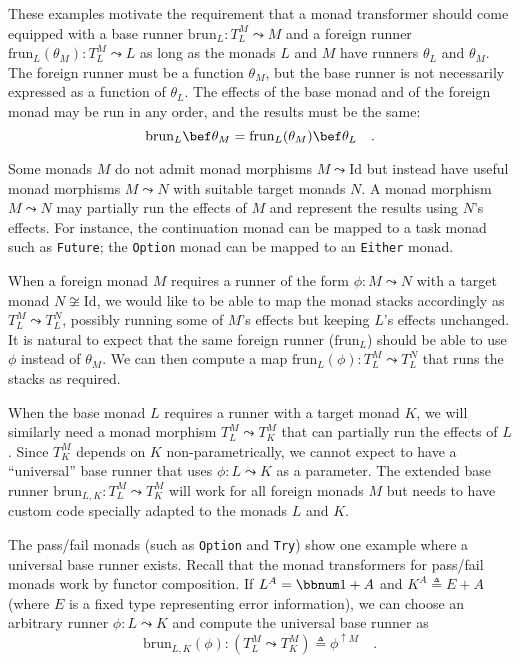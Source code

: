 These examples motivate the requirement that a monad transformer should
come equipped with a base runner $\text{brun}_{L}:T_{L}^{M}\leadsto M$
and a foreign runner $\text{frun}_{L}(\theta_{M}):T_{L}^{M}\leadsto L$
as long as the monads $L$ and $M$ have runners $\theta_{L}$ and
$\theta_{M}$. The foreign runner must be a function $\theta_{M}$,
but the base runner is not necessarily expressed as a function of
$\theta_{L}$. The effects of the base monad and of the foreign monad
may be run in any order, and the results must be the same:
\[
\text{brun}_{L}\bef\theta_{M}=\text{frun}_{L}(\theta_{M})\bef\theta_{L}\quad.
\]

Some monads $M$ do not admit monad morphisms $M\leadsto\text{Id}$
but instead have useful monad morphisms $M\leadsto N$ with suitable
target monads $N$. A monad morphism $M\leadsto N$ may partially
run the effects of $M$ and represent the results using $N$\textsf{'}s effects.
For instance, the continuation monad can be mapped to a task monad
such as \lstinline!Future!; the \lstinline!Option! monad can be
mapped to an \lstinline!Either! monad. 

When a foreign monad $M$ requires a runner of the form $\phi:M\leadsto N$
with a target monad $N\not\cong\text{Id}$, we would like to be able
to map the monad stacks accordingly as $T_{L}^{M}\leadsto T_{L}^{N}$,
possibly running some of $M$\textsf{'}s effects but keeping $L$\textsf{'}s effects
unchanged. It is natural to expect that the same foreign runner ($\text{frun}_{L}$)
should be able to use $\phi$ instead of $\theta_{M}$. We can then
compute a map $\text{frun}_{L}\left(\phi\right):T_{L}^{M}\leadsto T_{L}^{N}$
that runs the stacks as required.

When the base monad $L$ requires a runner with a target monad $K$,
we will similarly need a monad morphism $T_{L}^{M}\leadsto T_{K}^{M}$
that can partially run the effects of $L$. Since $T_{K}^{M}$ depends
on $K$ non-parametrically, we cannot expect to have a \textsf{``}universal\textsf{''}
base runner that uses $\phi:L\leadsto K$ as a parameter. The extended
base runner $\text{brun}_{L,K}:T_{L}^{M}\leadsto T_{K}^{M}$ will
work for all foreign monads $M$ but needs to have custom code specially
adapted to the monads $L$ and $K$.

The pass/fail monads (such as \lstinline!Option! and \lstinline!Try!)
show one example where a universal base runner
exists. Recall that the monad transformers for pass/fail monads work
by functor composition. If $L^{A}=\bbnum 1+A$ and $K^{A}\triangleq E+A$
(where $E$ is a fixed type representing error information), we can
choose an arbitrary runner $\phi:L\leadsto K$ and compute the universal
base runner as 
\[
\text{brun}_{L,K}(\phi):(T_{L}^{M}\leadsto T_{K}^{M})\triangleq\phi^{\uparrow M}\quad.
\]

